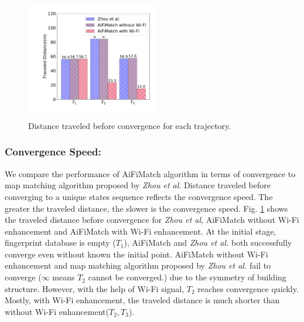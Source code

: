 \documentclass{llncs}
\begin{document}
\vspace{-10pt}
\begin{figure}[!htbp]
	\centering
	\includegraphics[width=2.3in]{AiFiMatch-Convergence}
	\caption{Distance traveled before convergence for each trajectory.}
	\label{fig-converg}
\end{figure}
\vspace{-10pt}

\subsubsection{Convergence Speed:}

We compare the performance of AiFiMatch algorithm in terms of convergence to map matching algorithm proposed by \emph{Zhou et al}. Distance traveled before converging to a unique states sequence reflects the convergence speed. The greater the traveled distance, the slower is the convergence speed. Fig. \ref{fig-converg} shows the traveled distance before convergence for \emph{Zhou et al}, AiFiMatch without Wi-Fi enhancement and AiFiMatch with Wi-Fi enhancement. At the initial stage, fingerprint database is empty ($T_1$), AiFiMatch and \emph{Zhou et al.} both successfully converge even without known the initial point. AiFiMatch without Wi-Fi enhancement and map matching algorithm proposed by \emph{Zhou et al.} fail to converge ($\infty$ means $T_2$ cannot be converged.) due to the symmetry of building structure. However, with the help of Wi-Fi signal, $T_2$ reaches convergence quickly. Mostly, with Wi-Fi enhancement, the traveled distance is much shorter than without Wi-Fi enhancement($T_2, T_3$). 



\end{document}

